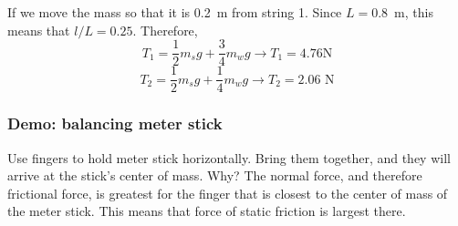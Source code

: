 If we move the mass so that it is 0.2~m from string 1. Since $L=0.8$~m, this means that $l/L=0.25$. Therefore,
$$T_1 = \frac{1}{2}m_sg + \frac{3}{4}m_wg \rightarrow \boxed{T_1= 4.76\mbox{N}}$$
$$T_2 = \frac{1}{2}m_sg +\frac{1}{4}m_wg \rightarrow \boxed{T_2 = 2.06\mbox{ N}}$$













\subsubsection*{Demo: balancing meter stick}
Use fingers to hold meter stick horizontally. Bring them together, and they will arrive at the stick's center of mass. Why? The normal force, and therefore frictional force, is greatest for the finger that is closest to the center of mass of the meter stick. This means that force of static friction is largest there.

